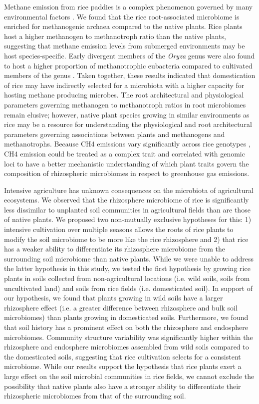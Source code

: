 Methane emission from rice paddies is a complex phenomenon governed by many environmental factors \cite{Minami1994}. We found that the rice root-associated microbiome is enriched for methanogenic archaea compared to the native plants. Rice plants host a higher methanogen to methanotroph ratio than the native plants, suggesting that methane emission levels from submerged environments may be host species-specific. Early divergent members of the \textit{Oryza} genus were also found to host a higher proportion of methanotrophic eubacteria compared to cultivated members of the genus \cite{Shenton2016}. Taken together, these results indicated that domestication of rice may have indirectly selected for a microbiota with a higher capacity for hosting methane producing microbes. The root architectural and physiological parameters governing methanogen to methanotroph ratios in root microbiomes remain elusive; however, native plant species growing in similar environments as rice may be a resource for understanding the physiological and root architectural parameters governing associations between plants and methanogens and methanotrophs. Because CH4 emissions vary significantly across rice genotypes \cite{Simmonds2015}, CH4 emission could be treated as a complex trait and correlated with genomic loci to have a better mechanistic understanding of which plant traits govern the composition of rhizospheric microbiomes in respect to greenhouse gas emissions.

Intensive agriculture has unknown consequences on the microbiota of agricultural ecosystems. We observed that the rhizosphere microbiome of rice is significantly less dissimilar to unplanted soil communities in agricultural fields than are those of native plants. We proposed two non-mutually exclusive hypotheses for this: 1) intensive cultivation over multiple seasons allows the roots of rice plants to modify the soil microbiome to be more like the rice rhizosphere and 2) that rice has a weaker ability to differentiate its rhizosphere microbiome from the surrounding soil microbiome than native plants. While we were unable to address the latter hypothesis in this study, we tested the first hypothesis by growing rice plants in soils collected from non-agricultural locations (i.e. wild soils, soils from uncultivated land) and soils from rice fields (i.e. domesticated soil). In support of our hypothesis, we found that plants growing in wild soils have a larger rhizosphere effect (i.e. a greater difference between rhizosphere and bulk soil microbiomes) than plants growing in domesticated soils. Furthermore, we found that soil history has a prominent effect on both the rhizosphere and endosphere microbiomes. Community structure variability was significantly higher within the rhizosphere and endosphere microbiomes assembled from wild soils compared to the domesticated soils, suggesting that rice cultivation selects for a consistent microbiome. While our results support the hypothesis that rice plants exert a large effect on the soil microbial communities in rice fields, we cannot exclude the possibility that native plants also have a stronger ability to differentiate their rhizospheric microbiomes from that of the surrounding soil. 

